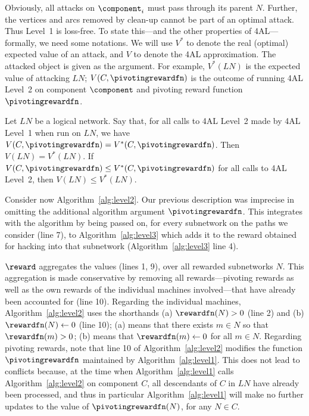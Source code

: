 Obviously, all attacks on $\component_i$ must pass through its parent
$N$. Further, the vertices and arcs removed by clean-up cannot be part
of an optimal attack. Thus Level~1 is loss-free. To state this---and
the other properties of 4AL---formally, we need some notations. We
will use $V^*$ to denote the real (optimal) expected value of an
attack, and $V$ to denote the 4AL approximation. The attacked object
is given as the argument. For example, $V^*(LN)$ is the expected value
of attacking $LN$; $V(C,\pivotingrewardfn)$ is the outcome of running
4AL Level~2 on component $\component$ and pivoting reward function
$\pivotingrewardfn$.

\begin{proposition}\label{pro:level1correct} 
Let $LN$ be a logical network. Say that, for all calls to 4AL Level~2
made by 4AL Level~1 when run on $LN$, we have $V(C,\pivotingrewardfn)
= V^*(C,\pivotingrewardfn)$. Then $V(LN) = V^*(LN)$. If
$V(C,\pivotingrewardfn) \leq V^*(C,\pivotingrewardfn)$ for all calls
to 4AL Level~2, then $V(LN) \leq V^*(LN)$.
\end{proposition}


Consider now Algorithm~\ref{alg:level2}. Our previous description was
imprecise in omitting the additional algorithm argument
$\pivotingrewardfn$. This integrates with the algorithm by being
passed on, for every subnetwork on the paths we consider (line 7), to
Algorithm~\ref{alg:level3} which adds it to the reward obtained for
hacking into that subnetwork (Algorithm~\ref{alg:level3} line 4).

$\reward$ aggregates the values (lines 1, 9), over all rewarded
subnetworks $N$. This aggregation is made conservative by removing all
rewards---pivoting rewards as well as the own rewards of the
individual machines involved---that have already been accounted for
(line 10). Regarding the individual machines,
Algorithm~\ref{alg:level2} uses the shorthands (a) $\rewardfn(N) > 0$
(line 2) and (b) $\rewardfn(N) \leftarrow 0$ (line 10); (a) means that
there exists $m \in N$ so that $\rewardfn(m) > 0$; (b) means that
$\rewardfn(m) \leftarrow 0$ for all $m \in N$. Regarding pivoting
rewards, note that line 10 of Algorithm~\ref{alg:level2} modifies the
function $\pivotingrewardfn$ maintained by
Algorithm~\ref{alg:level1}. This does not lead to conflicts because,
at the time when Algorithm~\ref{alg:level1} calls
Algorithm~\ref{alg:level2} on component $C$, all descendants of $C$ in
$LN$ have already been processed, and thus in particular
Algorithm~\ref{alg:level1} will make no further updates to the value
of $\pivotingrewardfn(N)$, for any $N \in C$.

